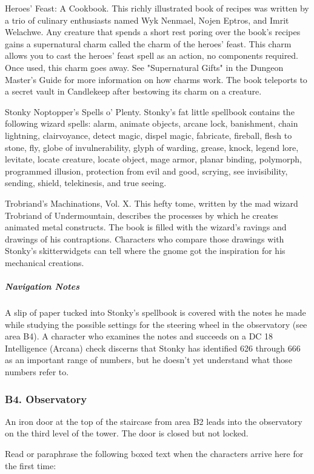 \documentclass[10pt,a4paper,twoside,bg=print,twocolumn,openany,nodeprecatedcode]{dndbook}
\begin{document}
Heroes' Feast: A Cookbook. This richly illustrated book of recipes was written by a trio of culinary enthusiasts named Wyk Nenmael, Nojen Eptros, and Imrit Welachwe. Any creature that spends a short rest poring over the book's recipes gains a supernatural charm called the charm of the heroes' feast. This charm allows you to cast the heroes' feast spell as an action, no components required. Once used, this charm goes away. See "Supernatural Gifts" in the Dungeon Master's Guide for more information on how charms work. The book teleports to a secret vault in Candlekeep after bestowing its charm on a creature.

Stonky Noptopper's Spells o' Plenty. Stonky's fat little spellbook contains the following wizard spells: alarm, animate objects, arcane lock, banishment, chain lightning, clairvoyance, detect magic, dispel magic, fabricate, fireball, flesh to stone, fly, globe of invulnerability, glyph of warding, grease, knock, legend lore, levitate, locate creature, locate object, mage armor, planar binding, polymorph, programmed illusion, protection from evil and good, scrying, see invisibility, sending, shield, telekinesis, and true seeing.

Trobriand's Machinations, Vol. X. This hefty tome, written by the mad wizard Trobriand of Undermountain, describes the processes by which he creates animated metal constructs. The book is filled with the wizard's ravings and drawings of his contraptions. Characters who compare those drawings with Stonky's skitterwidgets can tell where the gnome got the inspiration for his mechanical creations.

\subparagraph{Navigation Notes}
A slip of paper tucked into Stonky's spellbook is covered with the notes he made while studying the possible settings for the steering wheel in the observatory (see area B4). A character who examines the notes and succeeds on a DC 18 Intelligence (Arcana) check discerns that Stonky has identified 626 through 666 as an important range of numbers, but he doesn't yet understand what those numbers refer to.

\subsubsection{B4. Observatory}
An iron door at the top of the staircase from area B2 leads into the observatory on the third level of the tower. The door is closed but not locked.

Read or paraphrase the following boxed text when the characters arrive here for the first time:
\end{document}
